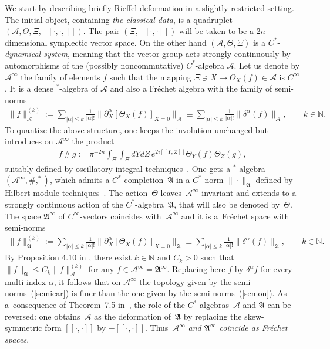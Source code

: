 \documentclass[pdftex]{sigma}
\def\A{{\mathcal A}}
\def\Th{\Theta}
\def\N{\mathbb{N}}
\def\AA{\mathfrak A}
\def\Ai{\mathcal A^\infty}
\def\AAi{\mathfrak A^\infty}
\begin{document}
We start by describing brief\/ly Rief\/fel deformation \cite{Rie1,Rie2} in a slightly restricted setting.
The initial object, containing {\it the classical data}, is a quadruplet
$\left(\A,\Theta,\Xi,[\![\cdot,\cdot,]\!]\right)$. The pair $\left(\Xi,[\![\cdot,\cdot]\!]\right)$ will
be taken to be a $2n$-dimensional symplectic vector space.
On the other hand $\left(\A,\Theta,\Xi\right)$ is a $C^*$-{\it dynamical system},
meaning that the vector group
acts strongly continuously by automorphisms of the (possibly noncommutative) $C^*$-algebra $\A$.
Let us denote by $\Ai$ the family of elements $f$ such that the mapping
$\Xi\ni X\mapsto\Th_X(f)\in\mathcal A$ is
$C^\infty$. It is a dense $^*$-algebra of $\A$ and also a Fr\'echet algebra with the family of semi-norms
\begin{gather}\label{semicar}
\| f\|_\A^{(k)}:=\sum_{|\alpha|\le
k}\frac{1}{|\alpha|!}\|\partial_X^\alpha\left[\Th_X(f)\right]_{X=0}\|_\A \equiv\sum_{|\alpha|\le
k}\frac{1}{|\alpha|!}\|\delta^\alpha (f)\|_\A ,
\qquad k\in\N .
\end{gather}
To quantize the above structure, one keeps the involution unchanged but introduces on $\Ai$ the product
\begin{gather*}%
f\,\#\,g:=\pi^{-2n}\int_\Xi\int_\Xi dYdZ\,e^{2i[\![Y,Z]\!]} \Th_Y(f) \Th_Z(g) ,
\end{gather*}
suitably def\/ined by oscillatory integral techniques~\cite{Fol89,Rie1}. One gets a $^*$-algebra $(\Ai,\#,^*)$, which admits a
$C^*$-completion~$\AA$ in a $C^*$-norm $\|\cdot\|_\AA$ def\/ined by Hilbert module techniques~\cite{Rie1}.
The action~$\Th$ leaves~$\Ai$ invariant and extends to a strongly continuous action of the
$C^*$-algebra~$\AA$, that will also be denoted by~$\Th$. The space $\AAi$ of $C^\infty$-vectors coincides with~$\Ai$
and it is a~Fr\'echet space with semi-norms
\begin{gather}\label{semon}
\| f\|_\AA^{(k)}:=\sum_{|\alpha|\le k}\frac{1}{|\alpha|!}\|\partial_X^\alpha\left[\Th_X(f)\right]_{X=0}
\|_\AA \equiv\sum_{|\alpha|\le
k}\frac{1}{|\alpha|!}\|\delta^\alpha (f)\|_\AA ,\qquad k\in\N  .
\end{gather}
By Proposition 4.10 in \cite{Rie1}, there exist $k\in\N $ and $C_k>0$ such that
$\| f\|_\AA \le C_k\| f\|^{(k)}_\A$ for any $f\in\A^\infty=\AA^\infty$.
Replacing here $f$ by $\delta^\alpha f$ for every multi-index $\alpha$, it follows that on $\A^\infty$ the topology given by
the semi-norms~(\ref{semicar}) is f\/iner than the one given by the semi-norms~(\ref{semon}). As a~consequence of
Theorem~7.5 in~\cite{Rie1}, the role of the $C^*$-algebras~$\A$ and $\AA$ can be reversed: one obtains~$\A$ as the deformation
of~$\AA$ by replacing the skew-symmetric form $[\![\cdot,\cdot]\!]$ by $-[\![\cdot,\cdot]\!]$.
Thus~$\A^\infty$ {\it and $\AA^\infty$ coincide as Fr\'echet spaces}.
\end{document}
